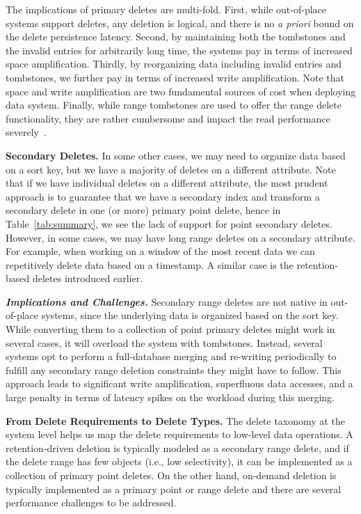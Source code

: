 \documentclass[11pt,dvipdfmx]{article}
\newcommand\Paragraph[1]{\vspace{0.02in}  \noindent \textbf{#1.}}
\newcommand\Paragraphbit[1]{\vspace{0.02in}  \noindent \textbf{\textit{#1.}}}
\begin{document}
The implications of primary deletes are multi-fold. First, while out-of-place 
systems support deletes, any deletion is logical, and there is no \emph{a priori}
bound on the delete persistence latency. Second, by maintaining both the tombstones
and the invalid entries for arbitrarily long time, the systems pay in terms of 
increased space amplification. Thirdly, by reorganizing data including invalid 
entries and tombstones, we further pay in terms of increased write amplification.
Note that space and write amplification \cite{Athanassoulis2016,Dong2017} are two 
fundamental sources of cost when deploying data system. Finally, while range 
tombstones are used to offer the range delete functionality, they are rather 
cumbersome and impact the read performance severely~\cite{Callaghan2020,Madan2018}.

\Paragraph{Secondary Deletes} In some other cases, we may need to organize data 
based on a sort key, but we have a majority of deletes on a different attribute.
Note that if we have individual deletes on a different attribute, the most 
prudent approach is to guarantee that we have a secondary index and transform a
secondary delete in one (or more) primary point delete, hence in
Table~\ref{tab:summary}, we see the lack of support for point secondary deletes.  
However, in some cases, we may have long range deletes on a secondary attribute. 
For example, when working on a window of the most recent data we can 
repetitively delete data based on a timestamp. A similar case is the 
retention-based deletes introduced earlier. 

\Paragraphbit{Implications and Challenges} Secondary range deletes are not 
native in out-of-place systems, since the underlying data is organized based on
the sort key. While converting them to a collection of point primary deletes might
work in several cases, it will overload the system with tombstones. Instead, 
several systems opt to perform a full-database merging and re-writing periodically
to fulfill any secondary range deletion constraints they might have to follow. This approach leads
to significant write amplification, superfluous data accesses, and a large 
penalty in terms of latency spikes on the workload during this merging.

\Paragraph{From Delete Requirements to Delete Types} The delete taxonomy at the
system level helps us map the delete requirements to low-level data operations. 
A retention-driven deletion is typically modeled as a secondary range delete, and
if the delete range has few objects (i.e., low selectivity), it can be implemented as a collection of
primary point deletes. On the other hand, on-demand deletion is typically 
implemented as a primary point or range delete and there are several performance 
challenges to be addressed.
\end{document}
